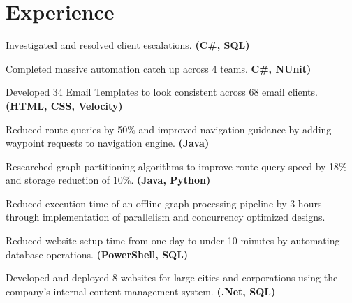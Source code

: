 \documentclass[letterpaper]{kevin-resume} %
\begin{document}
\begin{minipage}[t]{0.63\textwidth} %


\section{Experience}

\vspace{\topsep} %
\begin{tightitemize}
	\item Investigated and resolved client escalations. \textbf{(C\#, SQL)}
	\item Completed massive automation catch up across 4 teams. \textbf{C\#, NUnit)}
	\item Developed 34 Email Templates to look consistent across 68 email clients. \textbf{(HTML, CSS, Velocity)}
\end{tightitemize}

\sectionspace %

\vspace{\topsep} %
\begin{tightitemize}
	\item Reduced route queries by 50\% and improved navigation guidance by adding waypoint requests to navigation engine. \textbf{(Java)}
	\item Researched graph partitioning algorithms to improve route query speed by 18\% and storage reduction of 10\%. \textbf{(Java, Python)}
	\item Reduced execution time of an offline graph processing pipeline by 3 hours through implementation of parallelism and concurrency optimized designs.
\end{tightitemize}

\sectionspace %

\begin{tightitemize}
	\item Reduced website setup time from one day to under 10 minutes by automating database operations. \textbf{(PowerShell, SQL)}
	\item Developed and deployed 8 websites for large cities and corporations using the company's internal content management system. \textbf{(.Net, SQL)}
\end{tightitemize}


\end{minipage}
\end{document}
